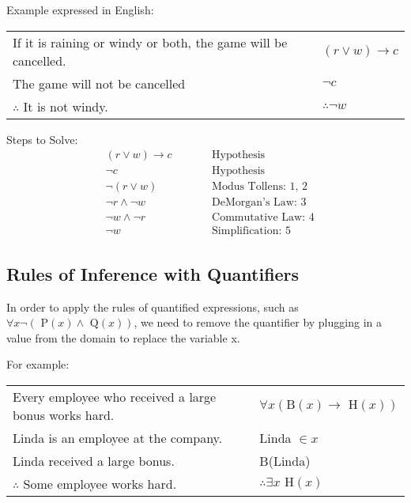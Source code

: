 Example expressed in English:
\begin{center}
  \begin{tabular}{lrl}
    If it is raining or windy or both, the game will be cancelled. &  & \((r \lor w) \rightarrow c\) \\
    The game will not be cancelled                                 &  & \(\lnot c\)                  \\
    \hhline{-~-}
    \(\therefore\) It is not windy.                                &  & \(\therefore \lnot w\)
  \end{tabular}

  Steps to Solve:
  \begin{align}
     & (r \lor w) \rightarrow c &  & \qquad \text{Hypothesis}          \\
     & \lnot c                  &  & \qquad \text{Hypothesis}          \\
     & \lnot (r \lor w)         &  & \qquad \text{Modus Tollens: 1, 2} \\
     & \lnot r \land \lnot w    &  & \qquad \text{DeMorgan's Law: 3}   \\
     & \lnot w \land \lnot r    &  & \qquad \text{Commutative Law: 4}  \\
     & \lnot w                  &  & \qquad \text{Simplification: 5}
  \end{align}
\end{center}

\subsection{Rules of Inference with Quantifiers}

In order to apply the rules of quantified expressions, such as \(\forall x \lnot (\text{ P}(x) \land \text{ Q}(x))\),
we need to remove the quantifier by plugging in a value from the domain to replace the variable x.

For example:
\begin{center}
  \begin{tabular}{lrl}
    Every employee who received a large bonus works hard. &  & \(\forall x (\text{B}(x) \rightarrow \text{ H}(x))\) \\
    Linda is an employee at the company.                  &  & Linda \(\in x\)                                      \\
    Linda received a large bonus.                         &  & B(Linda)                                             \\
    \hhline{-~-}
    \(\therefore\) Some employee works hard.              &  & \(\therefore \exists x \text{ H}(x)\)
  \end{tabular}
\end{center}

